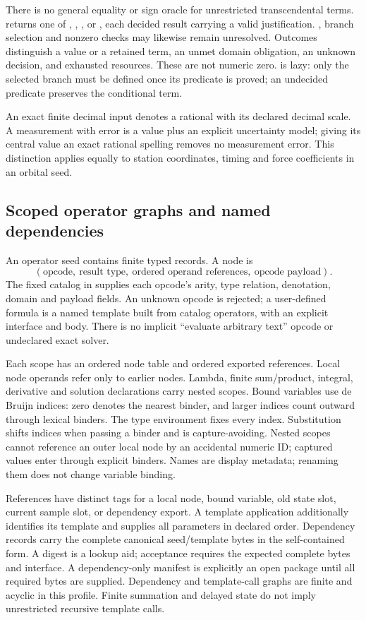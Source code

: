 There is no general equality or sign oracle for unrestricted transcendental
terms.  returns one of , , , or
, each decided result carrying a valid justification.
, branch selection and nonzero checks may likewise remain unresolved.
Outcomes distinguish a value or a retained term, an unmet domain obligation,
an unknown decision, and exhausted resources. These are not numeric zero.
 is lazy: only the selected branch must be defined once its predicate
is proved; an undecided predicate preserves the conditional term.

An exact finite decimal input denotes a rational with its declared decimal
scale. A measurement with error is a value plus an explicit uncertainty model;
giving its central value an exact rational spelling removes no measurement
error. This distinction applies equally to station coordinates, timing and force
coefficients in an orbital seed.

\subsection{Scoped operator graphs and named dependencies}
An operator seed contains finite typed records. A node is
\[
 (\text{opcode},\ \text{result type},\ \text{ordered operand references},
 \ \text{opcode payload}).
\]
The fixed  catalog in  supplies
each opcode's arity, type relation, denotation, domain and payload fields.
An unknown opcode is rejected; a user-defined formula is a named template built
from catalog operators, with an explicit interface and body. There is no implicit
``evaluate arbitrary text'' opcode or undeclared exact solver.

Each scope has an ordered node table and ordered exported references. Local
node operands refer only to earlier nodes. Lambda, finite sum/product, integral,
derivative and solution declarations carry nested scopes. Bound variables use
de Bruijn indices: zero denotes the nearest binder, and larger indices count
outward through lexical binders. The type environment fixes every index.
Substitution shifts indices when passing a binder and is capture-avoiding.
Nested scopes cannot reference an outer local node by an accidental numeric ID;
captured values enter through explicit binders. Names are display metadata;
renaming them does not change variable binding.

References have distinct tags for a local node, bound variable, old state slot,
current sample slot, or dependency export. A template application additionally
identifies its template and supplies all parameters in declared order. Dependency
records carry the complete canonical seed/template bytes in the self-contained
form. A digest is a lookup aid; acceptance requires the expected complete bytes
and interface. A dependency-only manifest is explicitly an open package until
all required bytes are supplied. Dependency and template-call graphs are finite
and acyclic in this profile. Finite summation and delayed state do not imply
unrestricted recursive template calls.


